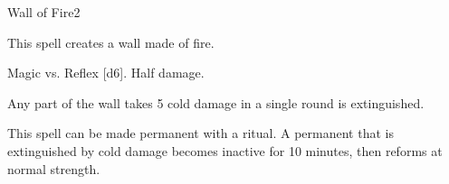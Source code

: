 \begin{spellsection}{Wall of Fire}{2}
    \begin{spellheader}
    \end{spellheader}
    \begin{spellcontent}
        \begin{spelltargetinginfo}
        \end{spelltargetinginfo}
        \begin{spelleffects}
            \spelleffect This spell creates a wall made of fire.
            \spelldur \durshort
        \end{spelleffects}
    \end{spellcontent}
    \begin{spellsubcontent}
        \begin{spelltargetinginfo}
        \end{spelltargetinginfo}
        \begin{spelleffects}
            \begin{spellattack}{Magic vs. Reflex}
                \spellsuccess {}[d6].
                \spellfailure Half damage.
            \end{spellattack}
        \end{spelleffects}
    \end{spellsubcontent}
    \begin{spellfooter}
        \spellnotes Any part of the wall takes 5 cold damage in a single round is extinguished.

        This spell can be made permanent with a  ritual. A permanent  that is extinguished by cold damage becomes inactive for 10 minutes, then reforms at normal strength.
        \miscastexplode
    \end{spellfooter}
\end{spellsection}

